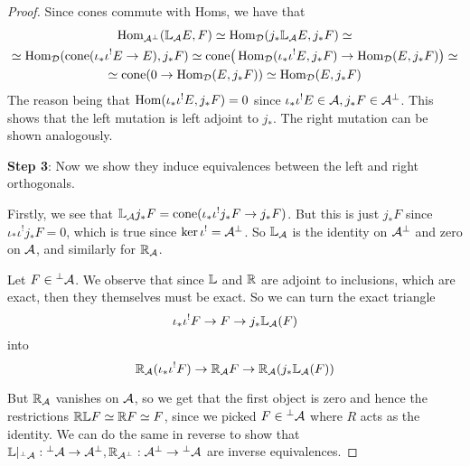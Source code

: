 \begin{proof}

    
    Since cones commute with Homs, we have that
    \begin{gather*}
        \operatorname{Hom}_{\mathcal{A}^\perp}(\mathbb{L}_{\mathcal{A}} E, F)\simeq \operatorname{Hom}_{\mathcal{D}}(j_*\mathbb{L}_{\mathcal{A}} E, j_*F) \simeq \\
        \simeq \operatorname{Hom}_{\mathcal{D}} (\mathrm{cone}(\iota_* \iota^! E \rightarrow E), j_*F)\simeq \mathrm{cone}\big(\operatorname{Hom}_{\mathcal{D}}(\iota_* \iota^! E, j_* F)\rightarrow \operatorname{Hom}_{\mathcal{D}}(E, j_*F)\big)\simeq \\
        \simeq \mathrm{cone}(0\rightarrow \operatorname{Hom}_{\mathcal{D}}(E, j_*F))\simeq \operatorname{Hom}_{\mathcal{D}}(E, j_*F)
    \end{gather*}
    The reason being that $\operatorname{Hom}(\iota_* \iota^! E, j_* F)=0$ since $\iota_* \iota^! E\in \mathcal{A}, j_*F \in \mathcal{A}^\perp$. This shows that the left mutation is left adjoint to $j_*$. The right mutation can be shown analogously.

    \textbf{Step 3}: Now we show they induce equivalences between the left and right orthogonals.

    Firstly, we see that $\mathbb{L}_{\mathcal{A}} j_* F = \mathrm{cone}(\iota_* \iota^! j_* F \rightarrow j_* F)$. But this is just $j_* F$ since $\iota_* \iota^! j_* F=0$, which is true since $\ker \iota^! = \mathcal{A}^\perp $. So $\mathbb{L}_{\mathcal{A}}$ is the identity on $\mathcal{A}^\perp$ and zero on $\mathcal{A}$, and similarly for $\mathbb{R}_{\mathcal{A}}$.

    Let $F\in \prescript{\perp}{}{}\mathcal{A}$. We observe that since $\mathbb{L}$ and $\mathbb{R}$ are adjoint to inclusions, which are exact, then they themselves must be exact. So we can turn the exact triangle $$\iota_* \iota^! F \rightarrow F \rightarrow j_*\mathbb{L}_{\mathcal{A}}(F)$$
    into $$\mathbb{R}_{\mathcal{A}}(\iota_* \iota^! F) \rightarrow \mathbb{R}_{\mathcal{A}} F \rightarrow \mathbb{R}_{\mathcal{A}} (j_*\mathbb{L}_{\mathcal{A}}(F))$$

    But $\mathbb{R}_{\mathcal{A}}$ vanishes on $\mathcal{A}$, so we get that the first object is zero and hence the restrictions $\mathbb{R} \mathbb{L} F \simeq \mathbb{R} F\simeq F$, since we picked $F\in \prescript{\perp}{}{}\mathcal{A}$ where $R$ acts as the identity. We can do the same in reverse to show that $\mathbb{L}|_{\prescript{\perp}{}{}\mathcal{A}}: \prescript{\perp}{}{}\mathcal{A} \rightarrow \mathcal{A}^\perp, \mathbb{R}_{\mathcal{A}^\perp}: \mathcal{A}^\perp \rightarrow \prescript{\perp}{}{}\mathcal{A}$ are inverse equivalences.


\end{proof}


